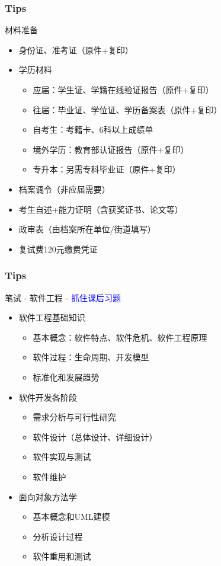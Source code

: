\documentclass[slide]{../custom}
\begin{document}
\begin{frame}
  \frametitle{Tips}
  \begin{block}{材料准备}
    \begin{itemize}
      \item 身份证、准考证（原件+复印）
      \item 学历材料
        \begin{itemize}
          \item 应届：学生证、学籍在线验证报告（原件+复印）
          \item 往届：毕业证、学位证、学历备案表（原件+复印）
          \item 自考生：考籍卡、6科以上成绩单
          \item 境外学历：教育部认证报告（原件+复印）
          \item 专升本：另需专科毕业证（原件+复印）
        \end{itemize}
      \item 档案调令（非应届需要）
      \item 考生自述+能力证明（含获奖证书、论文等）
      \item 政审表（由档案所在单位/街道填写）
      \item 复试费120元缴费凭证
    \end{itemize}
  \end{block}
\end{frame}

\begin{frame}
  \frametitle{Tips}
  \begin{block}{笔试 - 软件工程 - \textcolor{blue}{抓住课后习题} }
    \begin{itemize}
      \item 软件工程基础知识
        \begin{itemize}
          \item 基本概念：软件特点、软件危机、软件工程原理
          \item 软件过程：生命周期、开发模型
          \item 标准化和发展趋势
        \end{itemize}
      \item 软件开发各阶段
        \begin{itemize}
          \item 需求分析与可行性研究
          \item 软件设计（总体设计、详细设计）
          \item 软件实现与测试
          \item 软件维护
        \end{itemize}
      \item 面向对象方法学
        \begin{itemize}
          \item 基本概念和UML建模
          \item 分析设计过程
          \item 软件重用和测试
        \end{itemize}
    \end{itemize}
  \end{block}
\end{frame}
\end{document}

